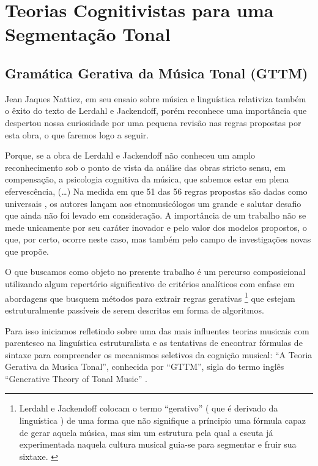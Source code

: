 \documentclass[
	12pt,				%
	openright,			%
	twoside,			%
	a4paper,			%
	english,			%
	french,				%
	spanish,			%
	brazil				%
	]{abntex2}
\begin{document}
\chapter{Teorias Cognitivistas para uma Segmentação Tonal}

\section{Gramática Gerativa da Música Tonal (GTTM)}
\label{GTTM}

Jean Jaques Nattiez, em seu ensaio sobre música e linguística \cite{nattiez2004modelos} relativiza também o êxito do texto de Lerdahl e Jackendoff, porém reconhece uma importância  que despertou nossa curiosidade por uma pequena revisão nas regras propostas por esta obra, o que faremos logo a seguir.

\begin{citacao}
Porque, se a obra de Lerdahl e Jackendoff não conheceu um amplo reconhecimento sob o ponto de vista da análise das obras stricto sensu, em compensação, a psicologia cognitiva da música, que sabemos estar em plena efervescência, (…) Na medida em que 51 das 56 regras propostas são dadas como universais \cite[ p.345-352]{lerdahl1983generative}, os autores lançam aos etnomusicólogos um grande e salutar desafio que ainda não foi levado em consideração. A importância de um trabalho não se mede unicamente por seu caráter inovador e pelo valor dos modelos propostos, o que, por certo, ocorre neste caso, mas também pelo campo de investigações novas que propõe.
\cite{nattiez2004modelos}
\end{citacao}


O que buscamos como objeto no presente trabalho é um percurso composicional utilizando algum repertório significativo de critérios analíticos com enfase em abordagens que busquem métodos para extrair regras gerativas
\footnote{
Lerdahl e Jackendoff colocam o termo “gerativo” ( que é derivado da linguística ) de uma forma que não signifique a príncipio uma fórmula capaz de gerar aquela música, mas sim um estrutura pela qual a escuta já experimentada naquela cultura musical guia-se para segmentar e fruir sua sixtaxe. \cite[ p.6]{lerdahl1983generative}
}
que estejam estruturalmente passíveis de serem descritas em forma de algoritmos. 

Para isso iniciamos refletindo sobre uma das mais influentes teorias musicais com parentesco na linguística estruturalista e as tentativas de encontrar fórmulas de sintaxe para compreender os mecanismos seletivos da cognição musical: “A Teoria Gerativa da Musica Tonal”, conhecida por “GTTM”, sigla do termo inglês “Generative Theory of Tonal Music” \cite{lerdahl1983generative}.
\end{document}
